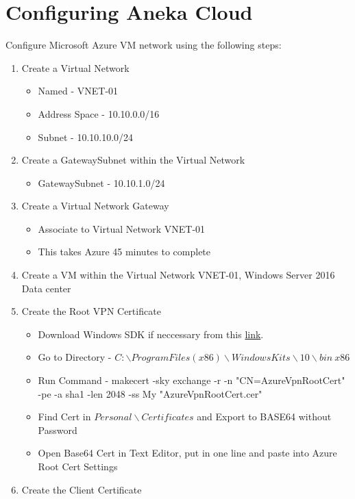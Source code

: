 \documentclass{article}
\begin{document}
\newpage

\section{Configuring Aneka Cloud}

Configure Microsoft Azure VM network using the following steps:
\begin{enumerate}
\item Create a Virtual Network
\begin{itemize}
\item Named - VNET-01
\item Address Space - 10.10.0.0/16
\item Subnet - 10.10.10.0/24
\end{itemize}
\item Create a GatewaySubnet within the Virtual Network
\begin{itemize}
\item GatewaySubnet - 10.10.1.0/24
\end{itemize}
\item Create a Virtual Network Gateway
\begin{itemize}
\item Associate to Virtual Network VNET-01
\item This takes Azure 45 minutes to complete
\end{itemize}
\item Create a VM within the Virtual Network VNET-01, Windows Server 2016 Data center
\item Create the Root VPN Certificate
\begin{itemize}
\item Download Windows SDK if neccessary from this \href{https://developer.microsoft.com/en-us/windows/downloads/windows-10-sdk}{link}. 
\item Go to Directory - $C:\backslash Program Files (x86)\backslash Windows Kits\backslash 10\backslash bin\ x86$
\item Run Command - makecert -sky exchange -r -n "CN=AzureVpnRootCert" -pe -a sha1 -len 2048 -ss My "AzureVpnRootCert.cer"
\item Find Cert in $Personal\backslash Certificates$ and Export to BASE64 without Password
\item Open Base64 Cert in Text Editor, put in one line and paste into Azure Root Cert Settings
\end{itemize}
\item Create the Client Certificate
\begin{itemize}

\end{itemize}
\end{enumerate}
\end{document}
